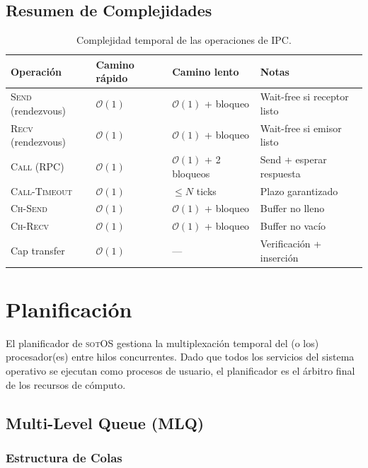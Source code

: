 \documentclass[11pt,twoside,openright]{book}
\theoremstyle{definition}
\theoremstyle{plain}
\theoremstyle{remark}
\newcommand{\sotos}{\textsc{sotOS}}
\newcommand{\bigO}{\mathcal{O}}
\begin{document}
\section{Resumen de Complejidades}

\begin{table}[ht]
\centering
\caption{Complejidad temporal de las operaciones de IPC.}
\label{tab:ipc-complexity}
\begin{tabular}{@{}llll@{}}
\toprule
\textbf{Operación} & \textbf{Camino rápido} & \textbf{Camino lento} & \textbf{Notas} \\
\midrule
\textsc{Send} (rendezvous) & $\bigO(1)$ & $\bigO(1)$ + bloqueo & Wait-free si receptor listo \\
\textsc{Recv} (rendezvous) & $\bigO(1)$ & $\bigO(1)$ + bloqueo & Wait-free si emisor listo \\
\textsc{Call} (RPC) & $\bigO(1)$ & $\bigO(1)$ + 2 bloqueos & Send + esperar respuesta \\
\textsc{Call-Timeout} & $\bigO(1)$ & $\leq N$ ticks & Plazo garantizado \\
\textsc{Ch-Send} & $\bigO(1)$ & $\bigO(1)$ + bloqueo & Buffer no lleno \\
\textsc{Ch-Recv} & $\bigO(1)$ & $\bigO(1)$ + bloqueo & Buffer no vacío \\
Cap transfer & $\bigO(1)$ & --- & Verificación + inserción \\
\bottomrule
\end{tabular}
\end{table}


\chapter{Planificación}
\label{chap:scheduling}

El planificador de \sotos{} gestiona la multiplexación temporal del (o los) procesador(es)
entre hilos concurrentes. Dado que todos los servicios del sistema operativo se ejecutan
como procesos de usuario, el planificador es el árbitro final de los recursos de cómputo.

\section{Multi-Level Queue (MLQ)}

\subsection{Estructura de Colas}
\end{document}
